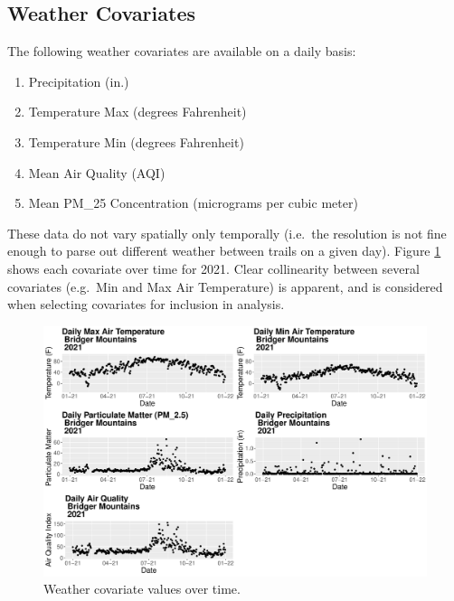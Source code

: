 \documentclass[
]{book}
\providecommand{\tightlist}{%
  \setlength{\itemsep}{0pt}\setlength{\parskip}{0pt}}
\begin{document}
\hypertarget{weather-covariates}{%
\subsection{Weather Covariates}\label{weather-covariates}}

The following weather covariates are available on a daily basis:

\begin{enumerate}
\def\labelenumi{\arabic{enumi}.}
\tightlist
\item
  Precipitation (in.)
\item
  Temperature Max (degrees Fahrenheit)
\item
  Temperature Min (degrees Fahrenheit)
\item
  Mean Air Quality (AQI)
\item
  Mean PM\_25 Concentration (micrograms per cubic meter)
\end{enumerate}

These data do not vary spatially only temporally (i.e.~the resolution is
not fine enough to parse out different weather between trails on a given
day). Figure \ref{fig:covariate-plots} shows each covariate over time
for 2021. Clear collinearity between several covariates (e.g.~Min and
Max Air Temperature) is apparent, and is considered when selecting
covariates for inclusion in analysis.

\begin{figure}

{\centering \includegraphics[width=1\linewidth]{../figures/weatherplots} 

}

\caption{Weather covariate values over time.}\label{fig:covariate-plots}
\end{figure}
\end{document}
